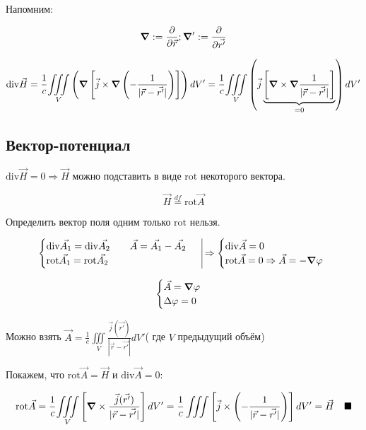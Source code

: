 Напомним: 

\[
\grad:=\frac{\partial}{\partial \vec{r}}; \grad ' := \frac{\partial}{\partial \vec{r'}}
\]

\[
\mathrm{div}\vec{H}=\frac{1}{c}\underset{V}{\iiint}\left( \grad \left[ \vec{j} \times \grad \left( -\frac{1}{|\vec{r}-\vec{r'}|}  \right) \right] \right)dV'= \frac{1}{c}\underset{V}{\iiint}\left( \vec{j}\underbrace{\left[ \grad \times \grad \frac{1}{|\vec{r}-\vec{r'}|}  \right]}_{=0} \right)dV'
\]

\subsection*{Вектор-потенциал}

$\mathrm{div}\vec{H}=0\Rightarrow \vec{H} $ можно подставить в виде $\mathrm{rot} $ некоторого вектора.

\[
\vec{H}\overset{df}{=}\mathrm{rot}\vec{A} 
\]

Определить вектор поля одним только $\mathrm{rot} $ нельзя. 

\[
\begin{aligned}
    \begin{array}{l|l}
        \begin{cases}
            \mathrm{div}\vec{A_1}=\mathrm{div}\vec{A_2} \qquad \vec{A}=\vec{A_1}-\vec{A_2} \\
            \mathrm{rot}\vec{A_1}=\mathrm{rot}\vec{A_2}    
        \end{cases}   
    \end{array}
    \Rightarrow
    \begin{cases}
        \mathrm{div}\vec{A}=0 \\
        \mathrm{rot}\vec{A}=0 \Rightarrow \vec{A}=-\grad\varphi 
    \end{cases}
\end{aligned}
\]

\[
\begin{cases}
    \vec{A}=\grad\varphi \\
    \Delta\varphi=0
\end{cases}
\]

Можно взять $\vec{A}=\frac{1}{c}\underset{V}{\iiint} \frac{\vec{j}(\vec{r'})}{|\vec{r}-\vec{r'}|}dV'$( где $V$ предыдущий объём)

Покажем, что $\mathrm{rot}\vec{A}=\vec{H} \text{ и } \mathrm{div}\vec{A}=0: $

\[
\mathrm{rot}\vec{A}=\frac{1}{c}\underset{V}{\iiint} \left[ \grad \times \frac{\vec{j}(\vec{r'})}{|\vec{r}-\vec{r'}|}  \right]dV'=\frac{1}{c}\iiint \left[ \vec{j}\times \left( -\frac{1}{|\vec{r}-\vec{r'}|}  \right) \right] dV'=\vec{H} \quad \blacksquare
\]


